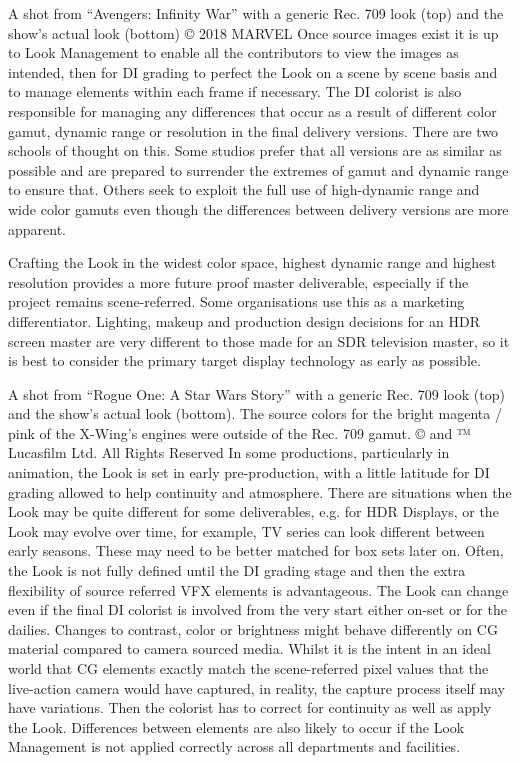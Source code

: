 A shot from “Avengers: Infinity War” with a generic Rec. 709 look (top) and the show’s actual look (bottom)
© 2018 MARVEL
Once source images exist it is up to Look Management to enable all the contributors to view the images as intended, then for DI grading to perfect the Look on a scene by scene basis and to manage elements within each frame if necessary. The DI colorist is also responsible for managing any differences that occur as a result of different color gamut, dynamic range or resolution in the final delivery versions. There are two schools of thought on this. Some studios prefer that all versions are as similar as possible and are prepared to surrender the extremes of gamut and dynamic range to ensure that. Others seek to exploit the full use of high-dynamic range and wide color gamuts even though the differences between delivery versions are more apparent.

Crafting the Look in the widest color space, highest dynamic range and highest resolution provides a more future proof master deliverable, especially if the project remains scene-referred. Some organisations use this as a marketing differentiator. Lighting, makeup and production design decisions for an HDR screen master are very different to those made for an SDR television master, so it is best to consider the primary target display technology as early as possible.



A shot from “Rogue One: A Star Wars Story” with a generic Rec. 709 look (top) and the show’s actual look (bottom). The source colors for the bright magenta / pink of the X-Wing’s engines were outside of the Rec. 709 gamut.
© and ™ Lucasfilm Ltd. All Rights Reserved
In some productions, particularly in animation, the Look is set in early pre-production, with a little latitude for DI grading allowed to help continuity and atmosphere. There are situations when the Look may be quite different for some deliverables, e.g. for HDR Displays, or the Look may evolve over time, for example, TV series can look different between early seasons. These may need to be better matched for box sets later on. Often, the Look is not fully defined until the DI grading stage and then the extra flexibility of source referred VFX elements is advantageous. The Look can change even if the final DI colorist is involved from the very start either on-set or for the dailies. Changes to contrast, color or brightness might behave differently on CG material compared to camera sourced media. Whilst it is the intent in an ideal world that CG elements exactly match the scene-referred pixel values that the live-action camera would have captured, in reality, the capture process itself may have variations. Then the colorist has to correct for continuity as well as apply the Look. Differences between elements are also likely to occur if the Look Management is not applied correctly across all departments and facilities.



